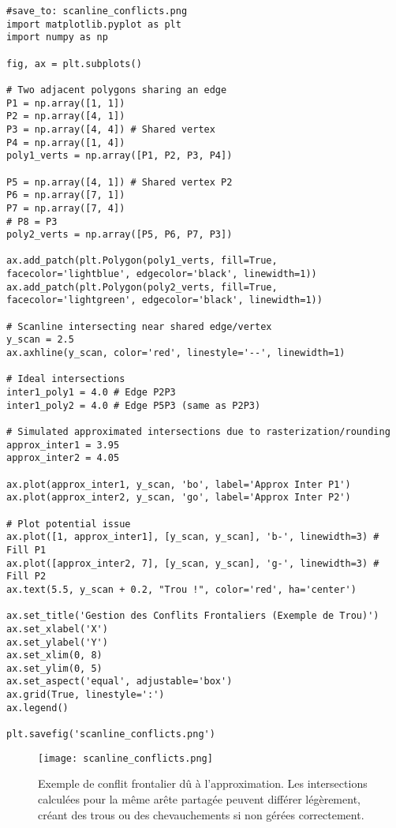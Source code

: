 \documentclass{article}
\begin{document}
\begin{verbatim}
#save_to: scanline_conflicts.png
import matplotlib.pyplot as plt
import numpy as np

fig, ax = plt.subplots()

# Two adjacent polygons sharing an edge
P1 = np.array([1, 1])
P2 = np.array([4, 1])
P3 = np.array([4, 4]) # Shared vertex
P4 = np.array([1, 4])
poly1_verts = np.array([P1, P2, P3, P4])

P5 = np.array([4, 1]) # Shared vertex P2
P6 = np.array([7, 1])
P7 = np.array([7, 4])
# P8 = P3
poly2_verts = np.array([P5, P6, P7, P3])

ax.add_patch(plt.Polygon(poly1_verts, fill=True, facecolor='lightblue', edgecolor='black', linewidth=1))
ax.add_patch(plt.Polygon(poly2_verts, fill=True, facecolor='lightgreen', edgecolor='black', linewidth=1))

# Scanline intersecting near shared edge/vertex
y_scan = 2.5
ax.axhline(y_scan, color='red', linestyle='--', linewidth=1)

# Ideal intersections
inter1_poly1 = 4.0 # Edge P2P3
inter1_poly2 = 4.0 # Edge P5P3 (same as P2P3)

# Simulated approximated intersections due to rasterization/rounding
approx_inter1 = 3.95
approx_inter2 = 4.05

ax.plot(approx_inter1, y_scan, 'bo', label='Approx Inter P1')
ax.plot(approx_inter2, y_scan, 'go', label='Approx Inter P2')

# Plot potential issue
ax.plot([1, approx_inter1], [y_scan, y_scan], 'b-', linewidth=3) # Fill P1
ax.plot([approx_inter2, 7], [y_scan, y_scan], 'g-', linewidth=3) # Fill P2
ax.text(5.5, y_scan + 0.2, "Trou !", color='red', ha='center')

ax.set_title('Gestion des Conflits Frontaliers (Exemple de Trou)')
ax.set_xlabel('X')
ax.set_ylabel('Y')
ax.set_xlim(0, 8)
ax.set_ylim(0, 5)
ax.set_aspect('equal', adjustable='box')
ax.grid(True, linestyle=':')
ax.legend()

plt.savefig('scanline_conflicts.png')
\end{verbatim}

\begin{figure}[H]
\centering
\texttt{[image: scanline\_conflicts.png]}
\caption{Exemple de conflit frontalier dû à l'approximation. Les intersections calculées pour la même arête partagée peuvent différer légèrement, créant des trous ou des chevauchements si non gérées correctement.}
\label{fig:scanline_conflicts}
\end{figure}
\end{document}
